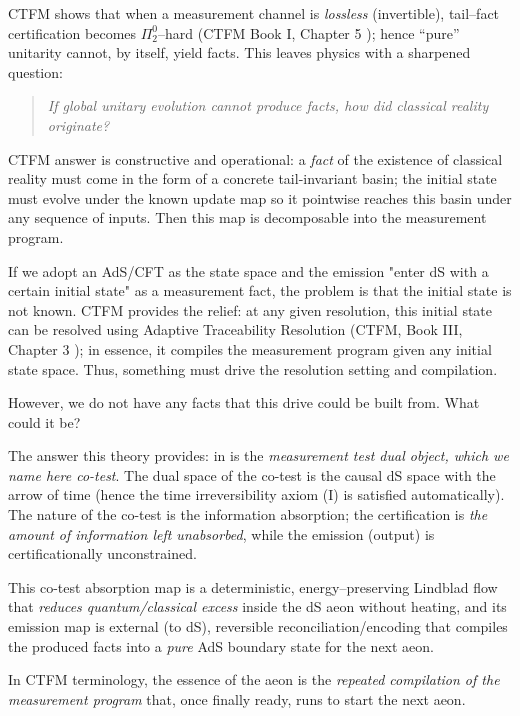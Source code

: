 \documentclass[10pt]{article}
\theoremstyle{definition}
\theoremstyle{plain}
\begin{document}
CTFM shows that when a measurement channel is \emph{lossless} (invertible), tail–fact certification becomes $\Pi^0_2$–hard (CTFM Book I, Chapter 5 \cite{CTFMBookI}); hence ``pure'' unitarity cannot, by itself, yield facts.
This leaves physics with a sharpened question:

\begin{quote}
\emph{If global unitary evolution cannot produce facts, how did classical reality originate?}
\end{quote}

CTFM answer is constructive and operational: a \emph{fact} of the existence of classical reality must come in the form of a concrete tail-invariant basin; the initial state must evolve under the known update map so it pointwise reaches this basin under any sequence of inputs. Then this map is decomposable into the measurement program.

If we adopt an AdS/CFT as the state space and the emission "enter dS with a certain initial state" as a measurement fact, the problem is that the initial state is not known. CTFM provides the relief: at any given resolution, this initial state can be resolved using Adaptive Traceability Resolution (CTFM, Book III, Chapter 3 \cite{CTFMBookIII}); in essence, it compiles the measurement program given any initial state space. Thus, something must drive the resolution setting and compilation.

However, we do not have any facts that this drive could be built from. What could it be?

The answer this theory provides: in is the \emph{measurement test dual object, which we name here co-test}. The dual space of the co-test is the causal dS space with the arrow of time (hence the time irreversibility axiom (I) is satisfied automatically). The nature of the co-test is the information absorption; the certification is \emph{the amount of information left unabsorbed}, while the emission (output) is certificationally unconstrained.

This co-test absorption map is a deterministic, energy–preserving Lindblad flow that \emph{reduces quantum/classical excess} inside the dS aeon without heating,
and its emission map is external (to dS), reversible reconciliation/encoding that compiles the produced facts into a \emph{pure} AdS boundary state for the next aeon.

In CTFM terminology, the essence of the aeon is the \emph{repeated compilation of the measurement program} that, once finally ready, runs to start the next aeon.
\end{document}
